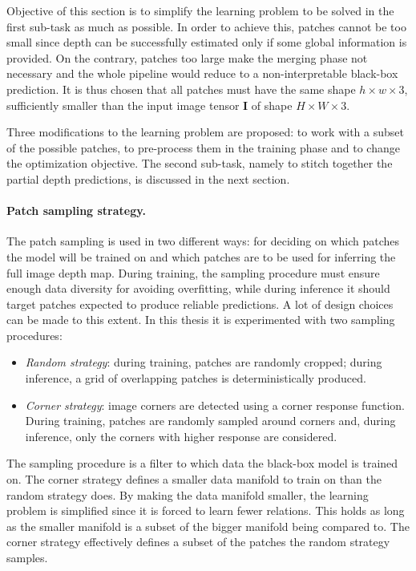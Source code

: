 Objective of this section is to simplify the learning problem to be solved in the first sub-task as much as possible.
In order to achieve this, patches cannot be too small since depth can be successfully estimated only if some global information is provided.
On the contrary, patches too large make the merging phase not necessary and the whole pipeline would reduce to a non-interpretable black-box prediction.
It is thus chosen that all patches must have the same shape $h \times w \times 3$, sufficiently smaller than the input image tensor $\mathbf{I}$ of shape $H \times W \times 3$.

Three modifications to the learning problem are proposed: to work with a subset of the possible patches, to pre-process them in the training phase and to change the optimization objective.
The second sub-task, namely to stitch together the partial depth predictions, is discussed in the next section.

\vspace{0.5cm}

\paragraph{Patch sampling strategy.}
The patch sampling is used in two different ways: for deciding on which patches the model will be trained on and which patches are to be used for inferring the full image depth map. 
During training, the sampling procedure must ensure enough data diversity for avoiding overfitting, while during inference it should target patches expected to produce reliable predictions.
A lot of design choices can be made to this extent.
In this thesis it is experimented with two sampling procedures:
\begin{itemize}
    \item{
        \textit{Random strategy}: during training, patches are randomly cropped; during inference, a grid of overlapping patches is deterministically produced.}
    \item{
        \textit{Corner strategy}: image corners are detected using a corner response function.
        During training, patches are randomly sampled around corners and, during inference, only the corners with higher response are considered.
    }
\end{itemize}
The sampling procedure is a filter to which data the black-box model is trained on.
The corner strategy defines a smaller data manifold to train on than the random strategy does.
By making the data manifold smaller, the learning problem is simplified since it is forced to learn fewer relations.
This holds as long as the smaller manifold is a subset of the bigger manifold being compared to.
The corner strategy effectively defines a subset of the patches the random strategy samples.

